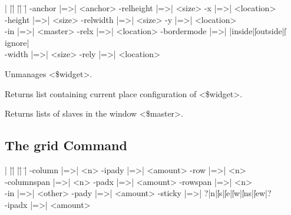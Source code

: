 \begin{tabbing}
|  |\=|               |\=|              |\= \kill
 \> -anchor |=>| <anchor>    \> -relheight |=>| <size> \> -x |=>| <location> \\
 \> -height |=>| <size>	\> -relwidth |=>| <size>  \> -y |=>| <location> \\
 \> -in |=>| <master>	\> -relx |=>| <location>  \> -bordermode |=>| |inside|\||outside|\||ignore| \\
 \> -width |=>| <size>	\> -rely |=>| <location>  \\
\end{tabbing}

\begin{enum}{1cm}

Unmanages <\$widget>.

Returns list containing current place configuration of <\$widget>.

Returns lists of slaves in the window <\$master>.

\end{enum}

\subsection*{The grid Command}
\vspace{-4pt}
\begin{enum}{1cm}


\end{enum}

\begin{tabbing}
|  |\=|               |\=|              |\= \kill
 \> -column |=>| <n>    	\> -ipady |=>| <amount> \> -row |=>| <n> \\
 \> -columnspan |=>| <n>	\> -padx |=>| <amount>  \> -rowspan |=>| <n> \\
 \> -in |=>| <other>		\> -pady |=>| <amount>  \> -sticky |=>| ?|n|\||s|\||e|\||w|\||ns|\||ew|? \\
 \> -ipadx |=>| <amount>	\> \\
\end{tabbing}

